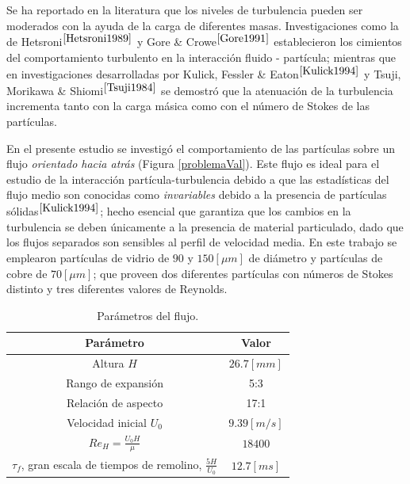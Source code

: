 \noindent
\justify

Se ha reportado en la literatura que los niveles de turbulencia pueden ser moderados con la ayuda de la carga de diferentes masas. Investigaciones como la de Hetsroni$^{\cite{Hetsroni1989}}$ y Gore \& Crowe$^{\cite{Gore1991}}$ establecieron los cimientos del comportamiento turbulento en la interacci\'on fluido - part\'icula; mientras que en investigaciones desarrolladas por Kulick, Fessler \& Eaton$^{\cite{Kulick1994}}$ y Tsuji, Morikawa \& Shiomi$^{\cite{Tsuji1984}}$ se demostr\'o que la atenuaci\'on de la turbulencia incrementa tanto con la carga m\'asica como con el n\'umero de Stokes de las part\'iculas.  

\noindent
\justify

En el presente estudio se investig\'o el comportamiento de las part\'iculas sobre un flujo \textit{orientado hacia atr\'as} (Figura \ref{problemaVal}). Este flujo es ideal para el estudio de la interacci\'on part\'icula-turbulencia debido a que las estad\'isticas del flujo medio son conocidas como \textit{invariables} debido a la presencia de part\'iculas s\'olidas$^{\cite{Kulick1994}}$; hecho esencial que garantiza que los cambios en la turbulencia se deben \'unicamente a la presencia de material particulado, dado que los flujos separados son sensibles al perfil de velocidad media. En este trabajo se emplearon part\'iculas de vidrio de $90$ y $150 [\mu m]$ de di\'ametro y part\'iculas de cobre de $70 [\mu m]$; que proveen dos diferentes part\'iculas con n\'umeros de Stokes distinto y tres diferentes valores de Reynolds. 

\begin{table}[h!]
	\centering
	\begin{tabular}{|c|c|}
		\hline
		\textbf{Par\'ametro} & \textbf{Valor} \\ \hline
		Altura $H$ & $26.7 [mm]$ \\ \hline
		Rango de expansi\'on & 5:3 \\ \hline
		Relaci\'on de aspecto & 17:1 \\ \hline
		Velocidad inicial $U_0$ & $9.39 [m/s]$ \\ \hline
		$Re_H = \frac{U_0 H}{\mu}$ & $18400$ \\ \hline
		$\tau _f$, gran escala de tiempos de remolino, $\frac{5H}{U_0}$ & $12.7 [ms]$ \\ \hline
	\end{tabular}
	\caption{Par\'ametros del flujo.}
	\label{dataFlow}
\end{table}

